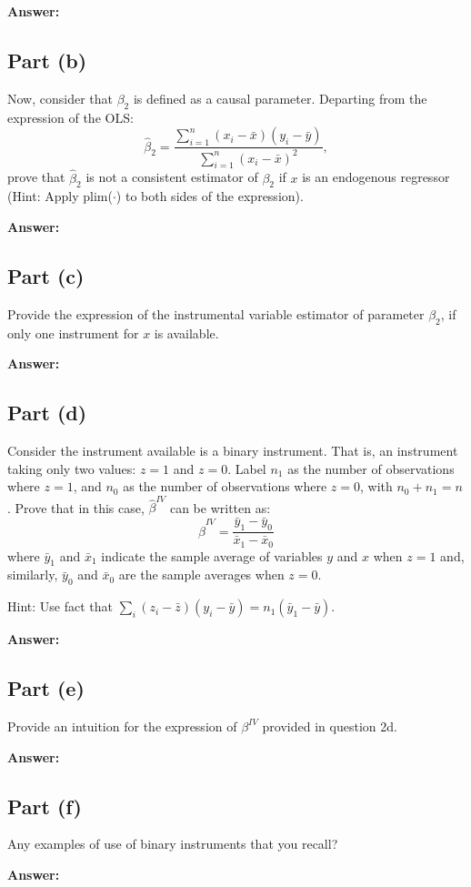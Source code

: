 \documentclass[12pt,a4paper]{article}
\begin{document}
\textbf{Answer:}



\subsection*{Part (b)}
Now, consider that $\beta_2$ is defined as a causal parameter. Departing from the expression of the OLS:
\[
\hat{\beta}_2 = \frac{\sum_{i=1}^n (x_i - \bar{x})(y_i - \bar{y})}{\sum_{i=1}^n (x_i - \bar{x})^2},
\]
prove that $\hat{\beta}_2$ is not a consistent estimator of $\beta_2$ if $x$ is an endogenous regressor (Hint: Apply plim($\cdot$) to both sides of the expression).

\textbf{Answer:}



\subsection*{Part (c)}
Provide the expression of the instrumental variable estimator of parameter $\beta_2$, if only one instrument for $x$ is available.

\textbf{Answer:}



\subsection*{Part (d)}
Consider the instrument available is a binary instrument. That is, an instrument taking only two values: $z = 1$ and $z = 0$. Label $n_1$ as the number of observations where $z = 1$, and $n_0$ as the number of observations where $z = 0$, with $n_0 + n_1 = n$. Prove that in this case, $\hat{\beta}^{IV}$ can be written as:
\[
\hat{\beta}^{IV} = \frac{\bar{y}_1 - \bar{y}_0}{\bar{x}_1 - \bar{x}_0}
\]
where $\bar{y}_1$ and $\bar{x}_1$ indicate the sample average of variables $y$ and $x$ when $z = 1$ and, similarly, $\bar{y}_0$ and $\bar{x}_0$ are the sample averages when $z = 0$.

Hint: Use fact that $\sum_i (z_i - \bar{z})(y_i - \bar{y}) = n_1(\bar{y}_1 - \bar{y})$.

\textbf{Answer:}



\subsection*{Part (e)}
Provide an intuition for the expression of $\beta^{IV}$ provided in question 2d.

\textbf{Answer:}



\subsection*{Part (f)}
Any examples of use of binary instruments that you recall?

\textbf{Answer:}
\end{document}
